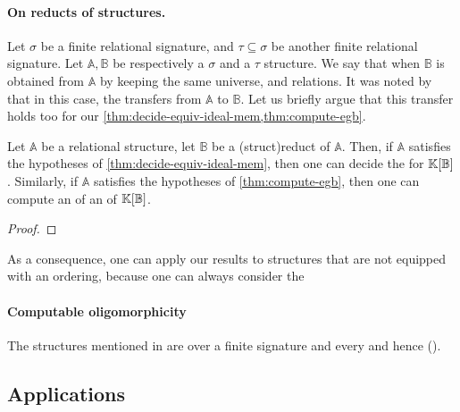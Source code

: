 \paragraph{On reducts of structures.} \AP Let $\sigma$ be a finite relational
signature, and $\tau \subseteq \sigma$ be another finite relational signature.
Let $\mathbb{A}, \mathbb{B}$ be respectively a $\sigma$ and a $\tau$ structure. We say
that  when $\mathbb{B}$ is
obtained from $\mathbb{A}$ by keeping the same universe, and relations. It was noted by \cite[Lemma 13]{GHOLAS24} that in
this case, the  transfers from
$\mathbb{A}$ to $\mathbb{B}$. Let us briefly argue that this transfer holds too
for our \cref{thm:decide-equiv-ideal-mem,thm:compute-egb}.


\begin{lemma}
  \label{lem:reducts-equiv-hilbert}
  Let $\mathbb{A}$ be a relational structure, let $\mathbb{B}$ be a 
  \kl(struct){reduct} of $\mathbb{A}$. Then, if $\mathbb{A}$ satisfies the
  hypotheses of \cref{thm:decide-equiv-ideal-mem},
  then one can decide the  for
  $\mathbb{K}[\mathbb{B}]$. Similarly, 
  if $\mathbb{A}$ satisfies the hypotheses of
  \cref{thm:compute-egb}, then one can compute an
   of an
   of $\mathbb{K}[\mathbb{B}]$.
\end{lemma}
\begin{proof}
\end{proof}

\AP 
As a consequence, one can apply our results to structures that are not equipped 
with an ordering, because one can always consider the 


\paragraph{Computable oligomorphicity}
%
The structures mentioned in  are  over a finite signature and every and hence  ().
%


\subsection{Applications}



